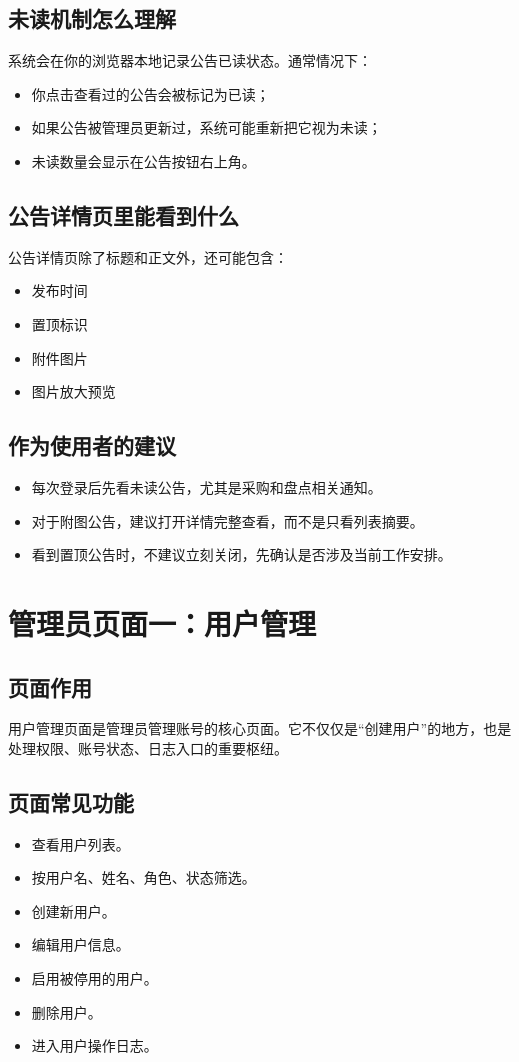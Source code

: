\documentclass[12pt,a4paper]{ctexart}
\begin{document}
\subsection{未读机制怎么理解}
系统会在你的浏览器本地记录公告已读状态。通常情况下：
\begin{itemize}
  \item 你点击查看过的公告会被标记为已读；
  \item 如果公告被管理员更新过，系统可能重新把它视为未读；
  \item 未读数量会显示在公告按钮右上角。
\end{itemize}

\subsection{公告详情页里能看到什么}
公告详情页除了标题和正文外，还可能包含：
\begin{itemize}
  \item 发布时间
  \item 置顶标识
  \item 附件图片
  \item 图片放大预览
\end{itemize}

\subsection{作为使用者的建议}
\begin{itemize}
  \item 每次登录后先看未读公告，尤其是采购和盘点相关通知。
  \item 对于附图公告，建议打开详情完整查看，而不是只看列表摘要。
  \item 看到置顶公告时，不建议立刻关闭，先确认是否涉及当前工作安排。
\end{itemize}

\newpage
\section{管理员页面一：用户管理}

\subsection{页面作用}
用户管理页面是管理员管理账号的核心页面。它不仅仅是“创建用户”的地方，也是处理权限、账号状态、日志入口的重要枢纽。

\subsection{页面常见功能}
\begin{itemize}
  \item 查看用户列表。
  \item 按用户名、姓名、角色、状态筛选。
  \item 创建新用户。
  \item 编辑用户信息。
  \item 启用被停用的用户。
  \item 删除用户。
  \item 进入用户操作日志。
\end{itemize}
\end{document}
